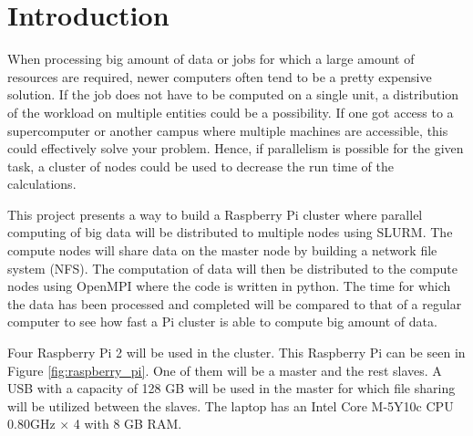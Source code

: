 \documentclass[../Head/Report.tex]{subfiles}
\begin{document}
\section{Introduction}
When processing big amount of data or jobs for which a large amount of resources are required, newer computers often tend to be a pretty expensive solution. If the job does not have to be computed on a single unit, a distribution of the workload on multiple entities could be a possibility. If one got access to a supercomputer or another campus where multiple machines are accessible, this could effectively solve your problem. Hence, if parallelism is possible for the given task, a cluster of nodes could be used to decrease the run time of the calculations.  

This project presents a way to build a Raspberry Pi cluster where parallel computing of big data will be distributed to multiple nodes using SLURM. The compute nodes will share data on the master node by building a network file system (NFS). The computation of data will then be distributed to the compute nodes using OpenMPI where the code is written in python. The time for which the data has been processed and completed will be compared to that of a regular computer to see how fast a Pi cluster is able to compute big amount of data.

Four Raspberry Pi 2 will be used in the cluster. This Raspberry Pi can be seen in Figure \ref{fig:raspberry_pi}. One of them will be a master and the rest slaves. A USB with a capacity of 128 GB will be used in the master for which file sharing will be utilized between the slaves. The laptop has an Intel Core M-5Y10c CPU 0.80GHz $\times $ 4 with 8 GB RAM.
\end{document}
